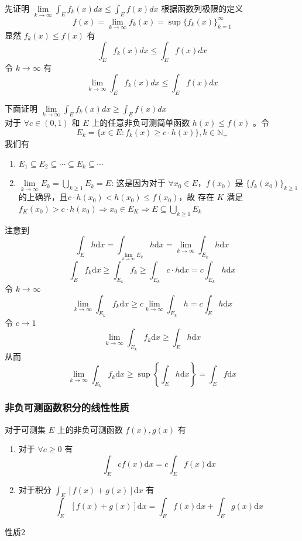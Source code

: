 \documentclass{ctexbook}
\newcommand{\no}{\noindent}
\newcommand{\pro}{\no{\bf 证明：}}
\newcommand{\ITEMS}{\begin{enumerate}[leftmargin=4em]}
\newcommand{\ITEME}{\end{enumerate}}
\begin{document}
\pro 

先证明 $\lim\limits_{k\to\infty} \int_E f_k(x) dx \le \int_E f(x) dx$ 根据函数列极限的定义
\[
f(x) = \lim\limits_{k\to\infty} f_k(x) = \sup \{ f_k(x) \}_{k=1}^\infty
\]
显然 $f_k(x) \le f(x)$ 有
\[
\int_E f_k(x) dx \le \int_E f(x) dx
\]
令 $k\to\infty$ 有
\[
\lim\limits_{k\to\infty} \int_E f_k(x) dx \le \int_E f(x) dx
\]

下面证明 $\lim\limits_{k\to\infty} \int_E f_k(x) dx \ge \int_E f(x) dx$\\ 

对于 $\forall c\in (0,1)$ 和 $E$ 上的任意非负可测简单函数 $h(x) \le f(x)$ 。令 
$$E_k =\{x\in E : f_k(x)\ge c\cdot h(x)\}, k\in\mathbb{N}_+$$ 我们有
\ITEMS
\item $E_1 \subseteq E_2 \subseteq \cdots \subseteq E_k \subseteq \cdots$
\item $\lim\limits_{k\to \infty}E_k = \bigcup\limits_{k\ge1} E_k = E$: 这是因为对于 $\forall x_0 \in E$，$f(x_0)$ 是 $\{f_k(x_0)\}_{k\ge1}$ 的上确界，且$c\cdot h(x_0) < h(x_0) \le f(x_0)$，故
存在 $K$ 满足 $f_K (x_0) >c\cdot h(x_0) \Rightarrow x_0 \in E_K \Rightarrow E \subseteq \bigcup\limits_{k \ge 1} E_k$ 
\ITEME
注意到
\[
\int_E h \mathrm{d}x = \int_{\lim_{k\to\infty} E_k} h\mathrm{d}x= \lim_{k\to\infty} \int_{E_k} h\mathrm{d}x 
\]
\[
\int_E f_k \mathrm{d}x\ge \int_{E_k} f_k \ge \int_{E_k} c\cdot h\mathrm{d}x = c\int_{E_k} h \mathrm{d}x
\]
令 $k \to \infty$
\[
\lim_{k\to\infty}\int_{E_k} f_k \mathrm{d}x\ge c\lim_{k\to\infty}\int_{E_k} h = c\int_{E} h\mathrm{d}x
\]
令 $c \to 1$
\[
\lim_{k\to\infty}\int_{E_k} f_k \mathrm{d}x\ge \int_{E} h \mathrm{d}x
\]
从而
\[
\lim_{k\to\infty}\int_{E_k} f_k \mathrm{d}x \ge \sup\left\{\int_{E} h \mathrm{d}x\right\} = \int_{E} f \mathrm{d}x
\]

\subsubsection{非负可测函数积分的线性性质}

对于可测集 $E$ 上的非负可测函数 $f(x),g(x)$ 有
\ITEMS
\item 对于 $\forall c \ge 0$ 有
\[
\int_E c f(x) \mathrm {d}x = c\int_E f(x) \mathrm {d}x
\]
\item 对于积分 $\int_E [f(x) + g(x)] \mathrm {d}x$ 有
\[
\int_E [f(x) + g(x)] \mathrm {d}x = \int_E f(x) \mathrm {d}x + \int_E g(x) \mathrm {d}x
\]
\ITEME 

\pro 性质2
\end{document}
